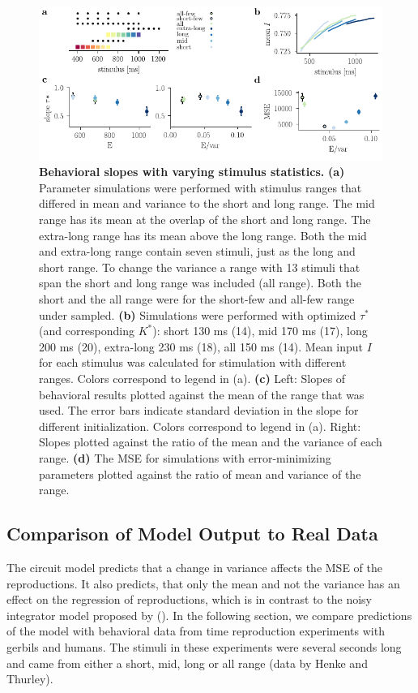 \documentclass[10pt]{article}
\begin{document}
\begin{figure}[ht]
	\centering
	\includegraphics{figures/ranges_new2.pdf}
	\caption{\textbf{Behavioral slopes with varying stimulus statistics.} 
	\textbf{(a)} Parameter simulations were performed with stimulus ranges that differed in mean and variance to the short and long range. The mid range has its mean at the overlap of the short and long range. The extra-long range has its mean above the long range. Both the mid and extra-long range contain seven stimuli, just as the long and short range. To change the variance a range with 13 stimuli that span the short and long range was included (all range). Both the short and the all range were for the short-few and all-few range under sampled.
	\textbf{(b)} Simulations were performed with optimized $\tau^*$ (and corresponding  $K^*$): short 130 ms (14), mid 170 ms (17), long 200 ms (20), extra-long 230 ms (18), all 150 ms (14). Mean input $I$ for each stimulus was calculated for stimulation with different ranges. Colors correspond to legend in (a). 
	\textbf{(c)} Left: Slopes of behavioral results plotted against the mean of the range that was used. The error bars indicate standard deviation in the slope for different initialization. Colors correspond to legend in (a).
	Right: Slopes plotted against the ratio of the mean and the variance of each range. 
	\textbf{(d)} The MSE for simulations with error-minimizing parameters plotted against the ratio of mean and variance of the range.
	}
\label{fig:new_ranges}
\end{figure}

\subsection{Comparison of Model Output to Real Data}
The circuit model predicts that a change in variance affects the MSE  of the reproductions.
It also predicts, that only the mean and not the variance has an effect on the regression of reproductions, which is in contrast to the noisy integrator model proposed by \citeauthor{Thurley2016} (\citeyear{Thurley2016}).
In the following section, we compare predictions of the model with behavioral data from time reproduction experiments with gerbils and humans. The stimuli in these experiments were several seconds long and came from either a short, mid, long or all range (data by Henke and Thurley).
\end{document}
